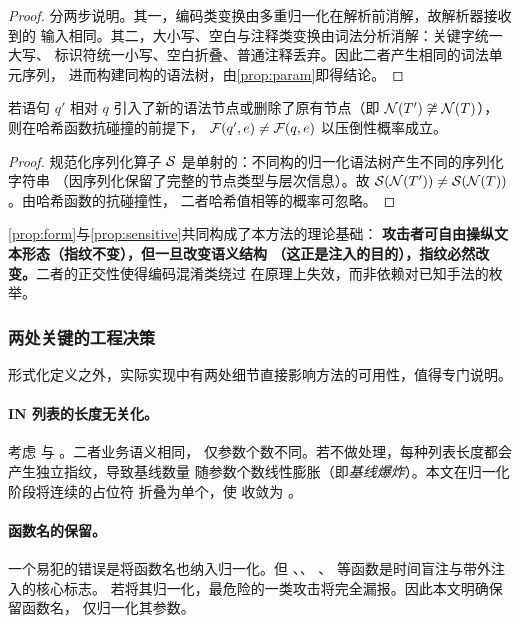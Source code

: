 \begin{proof}
分两步说明。其一，编码类变换由多重归一化在解析前消解，故解析器接收到的
输入相同。其二，大小写、空白与注释类变换由词法分析消解：关键字统一大写、
标识符统一小写、空白折叠、普通注释丢弃。因此二者产生相同的词法单元序列，
进而构建同构的语法树，由\cref{prop:param}即得结论。
\end{proof}

\begin{property}[结构敏感性]
\label{prop:sensitive}
若语句 $q'$ 相对 $q$ 引入了新的语法节点或删除了原有节点（即
$\mathcal{N}(T') \not\cong \mathcal{N}(T)$），则在哈希函数抗碰撞的前提下，
$\mathcal{F}(q', e) \neq \mathcal{F}(q, e)$ 以压倒性概率成立。
\end{property}

\begin{proof}
规范化序列化算子 $\mathcal{S}$ 是单射的：不同构的归一化语法树产生不同的序列化字符串
（因序列化保留了完整的节点类型与层次信息）。故
$\mathcal{S}(\mathcal{N}(T')) \neq \mathcal{S}(\mathcal{N}(T))$。由哈希函数的抗碰撞性，
二者哈希值相等的概率可忽略。
\end{proof}

\cref{prop:form}与\cref{prop:sensitive}共同构成了本方法的理论基础：
\textbf{攻击者可自由操纵文本形态（指纹不变），但一旦改变语义结构
（这正是注入的目的），指纹必然改变。}二者的正交性使得编码混淆类绕过
在原理上失效，而非依赖对已知手法的枚举。

\subsubsection{两处关键的工程决策}

形式化定义之外，实际实现中有两处细节直接影响方法的可用性，值得专门说明。

\paragraph{IN 列表的长度无关化。}
考虑  与 。二者业务语义相同，
仅参数个数不同。若不做处理，每种列表长度都会产生独立指纹，导致基线数量
随参数个数线性膨胀（即\emph{基线爆炸}）。本文在归一化阶段将连续的占位符
折叠为单个，使  收敛为 。

\paragraph{函数名的保留。}
一个易犯的错误是将函数名也纳入归一化。但 、、
、 等函数是时间盲注与带外注入的核心标志。
若将其归一化，最危险的一类攻击将完全漏报。因此本文明确保留函数名，
仅归一化其参数。

